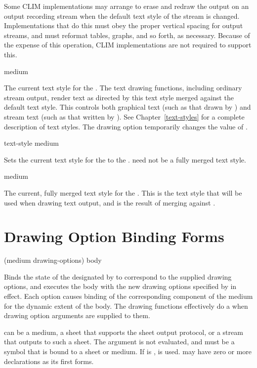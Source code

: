 Some CLIM implementations may arrange to erase and redraw the output on an
output recording stream when the default text style of the stream is changed.
Implementations that do this must obey the proper vertical spacing for output
streams, and must reformat tables, graphs, and so forth, as necessary.  Because
of the expense of this operation, CLIM implementations are not required to
support this.


 {medium}

The current text style for the  .  The text drawing
functions, including ordinary stream output, render text as directed by this
text style merged against the default text style.  This controls both graphical
text (such as that drawn by ) and stream text (such as that
written by ).  See Chapter~\ref{text-styles} for a complete
description of text styles.  The  drawing option temporarily
changes the value of .

 {text-style medium}

Sets the current text style for the   to the  .   need not be a fully merged text
style.


 {medium}

The current, fully merged text style for the  .  This
is the text style that will be used when drawing text output, and is the result
of merging  against .


\section {Drawing Option Binding Forms}

 {(medium \rest drawing-options) \body body}

Binds the state of the  designated by  to correspond to
the supplied drawing options, and executes the body with the new drawing options
specified by  in effect.  Each option causes binding of the
corresponding component of the medium for the dynamic extent of the body.  The
drawing functions effectively do a  when drawing option
arguments are supplied to them.

 can be a medium, a sheet that supports the sheet output protocol,
or a stream that outputs to such a sheet.  The  argument is not
evaluated, and must be a symbol that is bound to a sheet or medium.  If
 is ,  is used.   may have
zero or more declarations as its first forms.

